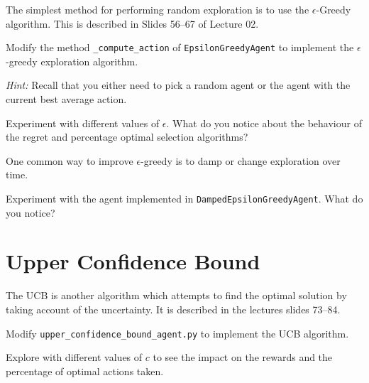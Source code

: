 \documentclass[twoside]{ucl_exam}
\begin{document}
\begin{question}

The simplest method for performing random exploration is to use the
$\epsilon$-Greedy algorithm. This is described in Slides 56--67 of
Lecture 02.

\begin{subquestion}

Modify the method \texttt{\_compute\_action} of \texttt{EpsilonGreedyAgent} to
implement the $\epsilon$-greedy exploration algorithm.

\emph{Hint:} Recall that you either need to pick a random agent or the agent
with the current best average action.

\end{subquestion}

\begin{subquestion}

Experiment with different values of $\epsilon$. What do you notice about the
behaviour of the regret and percentage optimal selection algorithms?

\end{subquestion}

\begin{subquestion}

One common way to improve $\epsilon$-greedy is to damp or change exploration
over time.

Experiment with the agent implemented in \texttt{DampedEpsilonGreedyAgent}. What
do you notice? 

\end{subquestion}

\end{question}

\section*{Upper Confidence Bound}

The UCB is another algorithm which attempts to find the optimal solution by
taking account of the uncertainty. It is described in the lectures slides
73--84.

\begin{question}

\begin{subquestion}

Modify \texttt{upper\_confidence\_bound\_agent.py} to implement the UCB algorithm.

\end{subquestion}

\begin{subquestion}

Explore with different values of $c$ to see the impact on the rewards and the
percentage of optimal actions taken.
 
\end{subquestion}
\end{question}
\end{document}

